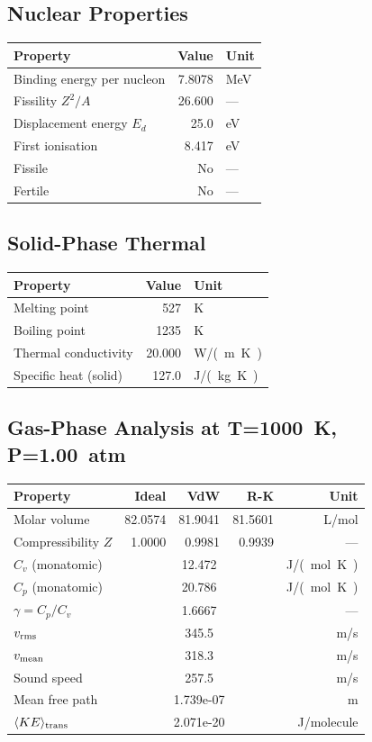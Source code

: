 \documentclass[11pt,a4paper]{article}
\begin{document}
\subsection{Nuclear Properties}
\begin{tabular}{lrl}
  \toprule
  Property & Value & Unit \\
  \midrule
  Binding energy per nucleon & 7.8078 & \si{MeV} \\
  Fissility $Z^2/A$ & 26.600 & --- \\
  Displacement energy $E_d$ & 25.0 & \si{eV} \\
  First ionisation & 8.417 & \si{eV} \\
  Fissile & No & --- \\
  Fertile & No & --- \\
  \bottomrule
\end{tabular}

\subsection{Solid-Phase Thermal}
\begin{tabular}{lrl}
  \toprule
  Property & Value & Unit \\
  \midrule
  Melting point & 527 & \si{K} \\
  Boiling point & 1235 & \si{K} \\
  Thermal conductivity & 20.000 & \si{W/(m.K)} \\
  Specific heat (solid) & 127.0 & \si{J/(kg.K)} \\
  \bottomrule
\end{tabular}

\subsection{Gas-Phase Analysis at T=\SI{1000}{K}, P=\SI{1.00}{atm}}
\begin{tabular}{lrrrr}
  \toprule
  Property & Ideal & VdW & R-K & Unit \\
  \midrule
  Molar volume & 82.0574 & 81.9041 & 81.5601 & \si{L/mol} \\
  Compressibility $Z$ & 1.0000 & 0.9981 & 0.9939 & --- \\
  \midrule
  $C_v$ (monatomic) & \multicolumn{3}{c}{12.472} & \si{J/(mol.K)} \\
  $C_p$ (monatomic) & \multicolumn{3}{c}{20.786} & \si{J/(mol.K)} \\
  $\gamma = C_p/C_v$ & \multicolumn{3}{c}{1.6667} & --- \\
  $v_{\rm rms}$ & \multicolumn{3}{c}{345.5} & \si{m/s} \\
  $v_{\rm mean}$ & \multicolumn{3}{c}{318.3} & \si{m/s} \\
  Sound speed & \multicolumn{3}{c}{257.5} & \si{m/s} \\
  Mean free path & \multicolumn{3}{c}{1.739e-07} & \si{m} \\
  $\langle KE \rangle_{\rm trans}$ & \multicolumn{3}{c}{2.071e-20} & \si{J/molecule} \\
  \bottomrule
\end{tabular}
\end{document}
